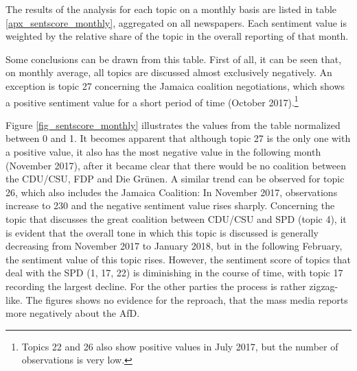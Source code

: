 \documentclass[12pt,a4paper,notitlepage]{article}
\begin{document}
The results of the analysis for each topic on a monthly basis are listed in table \ref{apx_sentscore_monthly}, aggregated on all newspapers. Each sentiment value is weighted by the relative share of the topic in the overall reporting of that month. 

Some conclusions can be drawn from this table. First of all, it can be seen that, on monthly average, all topics are discussed almost exclusively negatively. An exception is topic 27 concerning the Jamaica coalition negotiations, which shows a positive sentiment value for a short period of time (October 2017).\footnote{Topics 22 and 26 also show positive values in July 2017, but the number of observations is very low.} 

Figure \ref{fig_sentscore_monthly} illustrates the values from the table normalized between 0 and 1. It becomes apparent that although topic 27 is the only one with a positive value, it also has the most negative value in the following month (November 2017), after it became clear that there would be no coalition between the CDU/CSU, FDP and Die Grünen. A similar trend can be observed for topic 26, which also includes the Jamaica Coalition: In November 2017, observations increase to 230 and the negative sentiment value rises sharply. Concerning the topic that discusses the great coalition between CDU/CSU and SPD (topic 4), it is evident that the overall tone in which this topic is discussed is generally decreasing from November 2017 to January 2018, but in the following February, the sentiment value of this topic rises. However, the sentiment score of topics that deal with the SPD (1, 17, 22) is diminishing in the course of time, with topic 17 recording the largest decline. For the other parties the process is rather zigzag-like. The figures shows no evidence for the reproach, that the mass media reports more negatively about the AfD.
\end{document}

